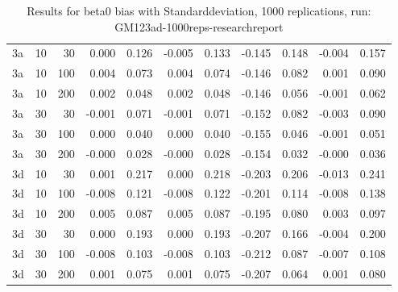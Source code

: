 \begin{table}[ht]
\begin{tabular}{lrrrrrrrrrr}
  3a & 10 & 30 & 0.000 & 0.126 & -0.005 & 0.133 & -0.145 & 0.148 & -0.004 & 0.157 \\ 
  3a & 10 & 100 & 0.004 & 0.073 & 0.004 & 0.074 & -0.146 & 0.082 & 0.001 & 0.090 \\ 
  3a & 10 & 200 & 0.002 & 0.048 & 0.002 & 0.048 & -0.146 & 0.056 & -0.001 & 0.062 \\ 
  3a & 30 & 30 & -0.001 & 0.071 & -0.001 & 0.071 & -0.152 & 0.082 & -0.003 & 0.090 \\ 
  3a & 30 & 100 & 0.000 & 0.040 & 0.000 & 0.040 & -0.155 & 0.046 & -0.001 & 0.051 \\ 
  3a & 30 & 200 & -0.000 & 0.028 & -0.000 & 0.028 & -0.154 & 0.032 & -0.000 & 0.036 \\ 
  3d & 10 & 30 & 0.001 & 0.217 & 0.000 & 0.218 & -0.203 & 0.206 & -0.013 & 0.241 \\ 
  3d & 10 & 100 & -0.008 & 0.121 & -0.008 & 0.122 & -0.201 & 0.114 & -0.008 & 0.138 \\ 
  3d & 10 & 200 & 0.005 & 0.087 & 0.005 & 0.087 & -0.195 & 0.080 & 0.003 & 0.097 \\ 
  3d & 30 & 30 & 0.000 & 0.193 & 0.000 & 0.193 & -0.207 & 0.166 & -0.004 & 0.200 \\ 
  3d & 30 & 100 & -0.008 & 0.103 & -0.008 & 0.103 & -0.212 & 0.087 & -0.007 & 0.108 \\ 
  3d & 30 & 200 & 0.001 & 0.075 & 0.001 & 0.075 & -0.207 & 0.064 & 0.001 & 0.080 \\ 
   \hline
\end{tabular}
\caption{Results for beta0 bias with Standarddeviation, 1000 replications, run: GM123ad-1000reps-researchreport} 
\label{tab:beta0_bias_sd}
\end{table}
